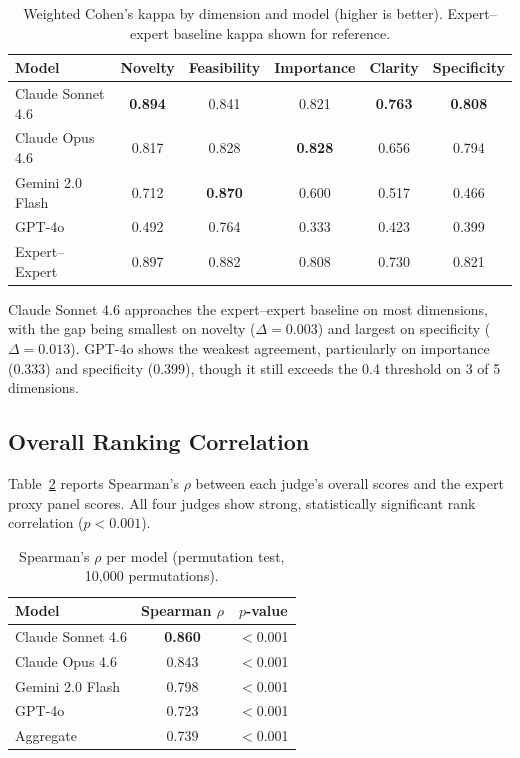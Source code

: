 \documentclass[11pt,a4paper]{article}
\begin{document}
\begin{table}[ht]
\centering
\caption{Weighted Cohen's kappa by dimension and model (higher is better).
Expert--expert baseline kappa shown for reference.}
\label{tab:kappa}
\begin{tabular}{lccccc}
\toprule
\textbf{Model} & \textbf{Novelty} & \textbf{Feasibility} & \textbf{Importance} & \textbf{Clarity} & \textbf{Specificity} \\
\midrule
Claude Sonnet 4.6 & \textbf{0.894} & 0.841 & 0.821 & \textbf{0.763} & \textbf{0.808} \\
Claude Opus 4.6   & 0.817 & 0.828 & \textbf{0.828} & 0.656 & 0.794 \\
Gemini 2.0 Flash  & 0.712 & \textbf{0.870} & 0.600 & 0.517 & 0.466 \\
GPT-4o            & 0.492 & 0.764 & 0.333 & 0.423 & 0.399 \\
\midrule
Expert--Expert     & 0.897 & 0.882 & 0.808 & 0.730 & 0.821 \\
\bottomrule
\end{tabular}
\end{table}

Claude Sonnet 4.6 approaches the expert--expert baseline on most
dimensions, with the gap being smallest on novelty ($\Delta = 0.003$) and
largest on specificity ($\Delta = 0.013$).  GPT-4o shows the weakest
agreement, particularly on importance (0.333) and specificity (0.399),
though it still exceeds the 0.4 threshold on 3 of 5 dimensions.

\subsection{Overall Ranking Correlation}

Table~\ref{tab:spearman} reports Spearman's $\rho$ between each judge's
overall scores and the expert proxy panel scores.  All four judges show
strong, statistically significant rank correlation ($p < 0.001$).

\begin{table}[ht]
\centering
\caption{Spearman's $\rho$ per model (permutation test, 10{,}000 permutations).}
\label{tab:spearman}
\begin{tabular}{lcc}
\toprule
\textbf{Model} & \textbf{Spearman $\rho$} & \textbf{$p$-value} \\
\midrule
Claude Sonnet 4.6  & \textbf{0.860} & $<$0.001 \\
Claude Opus 4.6    & 0.843 & $<$0.001 \\
Gemini 2.0 Flash   & 0.798 & $<$0.001 \\
GPT-4o             & 0.723 & $<$0.001 \\
\midrule
Aggregate          & 0.739 & $<$0.001 \\
\bottomrule
\end{tabular}
\end{table}
\end{document}

